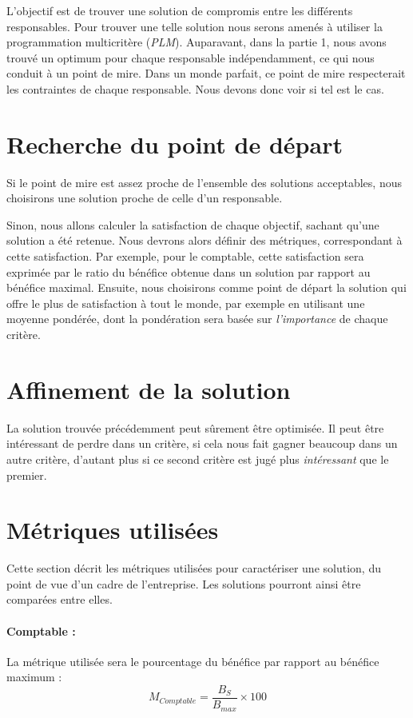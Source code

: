 
L'objectif est de trouver une solution de compromis entre les différents responsables.
Pour trouver une telle solution nous serons amenés à utiliser la programmation multicritère (\emph{PLM}).
Auparavant, dans la partie 1, nous avons trouvé un optimum pour chaque
responsable indépendam\-ment, ce qui nous conduit à un point de mire. Dans un
monde parfait, ce point de mire respecterait les contraintes de chaque
responsable. Nous devons donc voir si tel est le cas. 

\section{Recherche du point de départ}
Si le point de mire est assez proche de l'ensemble des solutions acceptables,
nous choisirons une solution proche de celle d'un responsable.

Sinon, nous allons calculer la satisfaction de chaque objectif, sachant qu'une
solution a été retenue. Nous devrons alors définir des métriques, correspondant
à cette satisfaction. Par exemple, pour le comptable, cette satisfaction sera
exprimée par le ratio du bénéfice obtenue dans un solution par rapport au
bénéfice maximal.
Ensuite, nous choisirons comme point de départ la solution qui offre le plus de
satisfaction à tout le monde, par exemple en utilisant une moyenne pondérée,
dont la pondération sera basée sur \emph{l'importance} de chaque critère.

\section{Affinement de la solution}
La solution trouvée précédemment peut sûrement être optimisée. Il peut être
intéressant de perdre dans un critère, si cela nous fait gagner beaucoup dans
un autre critère, d'autant plus si ce second critère est jugé plus
\emph{intéressant} que le premier.

\section{Métriques utilisées}
Cette section décrit les métriques utilisées pour caractériser une solution, du
point de vue d'un cadre de l'entreprise. Les solutions pourront ainsi être
comparées entre elles.

\paragraph{Comptable :}
La métrique utilisée sera le pourcentage du bénéfice par rapport au bénéfice
maximum :
$$
M_{Comptable} = \frac{B_{S}}{B_{max}} \times 100
$$

